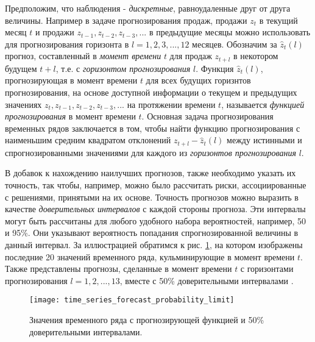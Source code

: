 Предположим, что наблюдения - \textit{дискретные}, равноудаленные друг от друга величины. 
Например в задаче прогнозирования продаж, продажи $z_t$ в текущий месяц $t$ и продажи 
$z_{t-1}, z_{t-2}, z_{t-3}, ...$ в предыдущие месяцы можно использовать для 
прогнозирования горизонта в $l = 1, 2, 3, ..., 12$ месяцев. Обозначим за $\hat{z}_t (l)$ 
прогноз, составленный в \textit{момент времени} $t$ для продаж $z_{t+l}$ в некотором будущем $t+l$, т.е.
с \textit{горизонтом прогнозирования} $l$. Функция $\hat{z}_t (l)$, прогнозирующая в момент времени 
$t$ для всех будущих горизнтов прогнозирования, на основе доступной информации о 
текущем и предыдущих значениях $z_t, z_{t-1}, z_{t-2}, z_{t-3}, ...$ на протяжении времени $t$, 
называется \textit{функцией прогнозирования} в момент времени $t$. Основная задача 
прогнозирования временных рядов заключается в том, чтобы найти функцию прогнозирования с 
наименьшим средним квадратом отклонений $z_{t+l} - \hat{z}_t (l)$ между истинными и 
спрогнозированными значениями для каждого из \textit{горизонтов прогнозирования} $l$. 

В добавок к нахождению наилучших прогнозов, также необходимо указать их точность, так 
чтобы, например, можно было рассчитать риски, ассоциированные с решениями, принятыми на 
их основе. Точность прогнозов можно выразить в качестве \textit{доверительных интервалов} 
с каждой стороны прогноза. Эти интервалы могут быть рассчитаны для любого удобного набора 
вероятностей, например, 50 и 95\%. Они указывают вероятность попадания спрогнозированной 
величины в данный интервал. За иллюстрацией обратимся к рис. \ref{fig:time_series_forecast_probability_limit}, 
на котором изображены последние 20 значений временного ряда, кульминирующие в момент времени $t$. 
Также представлены прогнозы, сделанные в момент времени $t$ с горизонтами прогнозирования 
$l = 1, 2, ..., 13$, вместе с 50\% доверительными интервалами \cite{TSA_Box}.

\begin{figure}[h!]
    \centering
    \texttt{[image: time\_series\_forecast\_probability\_limit]}
    \caption{Значения временного ряда с прогнозирующей функцией и 50\% доверительными интервалами.}
    \label{fig:time_series_forecast_probability_limit}
\end{figure}


